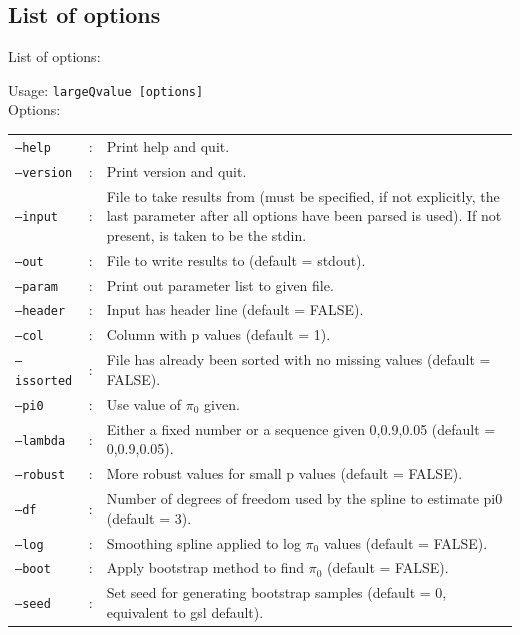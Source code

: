 \documentclass{amsart}
\begin{document}
\begin{framed}
  \subsection{List of options}

  \noindent List of options:

  \noindent Usage: \texttt{largeQvalue [options]}\\
  \noindent Options:


 \begin{tabular}{llp{9cm}}
    \texttt{--help}    & : &Print help and quit. \\
    \texttt{--version} & : &Print version and quit. \\
    \texttt{--input}   & : &File to take results from (must be specified, if not explicitly, the last parameter after all options have been parsed is used). If not present, is taken to be the stdin. \\
    \texttt{--out}     & : &File to write results to (default = stdout). \\
    \texttt{--param}   & : &Print out parameter list to given file. \\
    \texttt{--header}  & : &Input has header line (default = FALSE). \\
    \texttt{--col}     & : &Column with p values (default = 1). \\
    \texttt{--issorted}& : &File has already been sorted with no missing values (default = FALSE). \\
    \texttt{--pi0}     & : &Use value of $\pi_0$ given. \\
    \texttt{--lambda}  & : &Either a fixed number or a sequence given 0,0.9,0.05 (default = 0,0.9,0.05). \\
    \texttt{--robust}  & : &More robust values for small p values (default = FALSE). \\
    \texttt{--df}      & : &Number of degrees of freedom used by the spline to estimate pi0 (default = 3). \\ 
    \texttt{--log}     & : &Smoothing spline applied to log $\pi_0$ values (default = FALSE). \\
    \texttt{--boot}    & : &Apply bootstrap method to find $\pi_0$ (default = FALSE). \\
    \texttt{--seed}    & : &Set seed for generating bootstrap samples (default = 0, equivalent to gsl default). \\
\end{tabular}
\end{framed}
\end{document}
